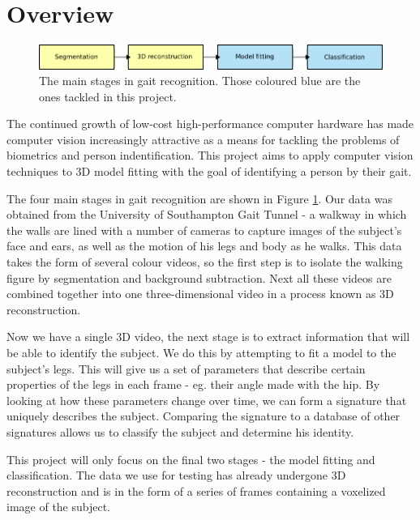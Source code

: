 \section{Overview}

\begin{figure}[b]
	\centering
	\includegraphics[width=12cm]{overview.png}
	\caption{The main stages in gait recognition.
		Those coloured blue are the ones tackled in this project.}
	\label{OverviewBoxes}
\end{figure}

The continued growth of low-cost high-performance computer hardware has made computer vision increasingly attractive as a means for tackling the problems of biometrics and person indentification.
This project aims to apply computer vision techniques to 3D model fitting with the goal of identifying a person by their gait.

The four main stages in gait recognition are shown in Figure \ref{OverviewBoxes}.
Our data was obtained from the University of Southampton Gait Tunnel -
a walkway in which the walls are lined with a number of cameras to capture images of the subject's face and ears, as well as the motion of his legs and body as he walks.
This data takes the form of several colour videos, so the first step is to isolate the walking figure by segmentation and background subtraction.
Next all these videos are combined together into one three-dimensional video in a process known as 3D reconstruction.

Now we have a single 3D video, the next stage is to extract information that will be able to identify the subject.
We do this by attempting to fit a model to the subject's legs.
This will give us a set of parameters that describe certain properties of the legs in each frame - eg. their angle made with the hip.
By looking at how these parameters change over time, we can form a signature that uniquely describes the subject.
Comparing the signature to a database of other signatures allows us to classify the subject and determine his identity.

This project will only focus on the final two stages - the model fitting and classification.
The data we use for testing has already undergone 3D reconstruction and is in the form of a series of frames containing a voxelized image of the subject.
